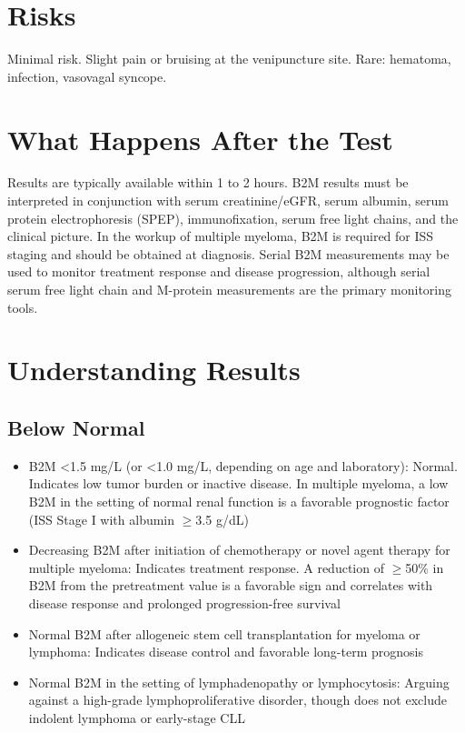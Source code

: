 \section*{Risks}
Minimal risk. Slight pain or bruising at the venipuncture site. Rare: hematoma, infection, vasovagal syncope.

\section*{What Happens After the Test}
Results are typically available within 1 to 2 hours. B2M results must be interpreted in conjunction with serum creatinine/eGFR, serum albumin, serum protein electrophoresis (SPEP), immunofixation, serum free light chains, and the clinical picture. In the workup of multiple myeloma, B2M is required for ISS staging and should be obtained at diagnosis. Serial B2M measurements may be used to monitor treatment response and disease progression, although serial serum free light chain and M-protein measurements are the primary monitoring tools.

\section*{Understanding Results}

\subsection*{Below Normal}
\begin{itemize}
  \item B2M <1.5 mg/L (or <1.0 mg/L, depending on age and laboratory): Normal. Indicates low tumor burden or inactive disease. In multiple myeloma, a low B2M in the setting of normal renal function is a favorable prognostic factor (ISS Stage I with albumin $\geq$3.5 g/dL)
  \item Decreasing B2M after initiation of chemotherapy or novel agent therapy for multiple myeloma: Indicates treatment response. A reduction of $\geq$50\% in B2M from the pretreatment value is a favorable sign and correlates with disease response and prolonged progression-free survival
  \item Normal B2M after allogeneic stem cell transplantation for myeloma or lymphoma: Indicates disease control and favorable long-term prognosis
  \item Normal B2M in the setting of lymphadenopathy or lymphocytosis: Arguing against a high-grade lymphoproliferative disorder, though does not exclude indolent lymphoma or early-stage CLL
\end{itemize}

